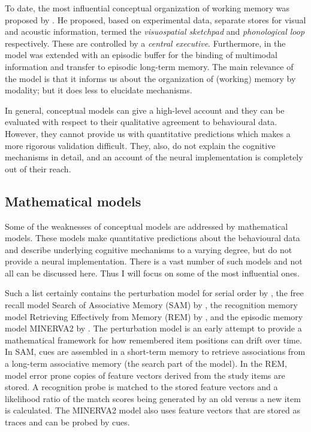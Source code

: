 To date, the most influential conceptual organization of working memory was proposed by \textcite{Baddeley1986}.
He proposed, based on experimental data, separate stores for visual and acoustic information, termed the \emph{visuospatial sketchpad} and \emph{phonological loop} respectively.
These are controlled by a \emph{central executive}.
Furthermore, in \textcite{Baddeley2000} the model was extended with an episodic buffer for the binding of multimodal information and transfer to episodic long-term memory.
The main relevance of the model is that it informs us about the organization of (working) memory by modality; but it does less to elucidate mechanisms.

In general, conceptual models can give a high-level account and they can be evaluated with respect to their qualitative agreement to behavioural data.
However, they cannot provide us with quantitative predictions which makes a more rigorous validation difficult.
They, also, do not explain the cognitive mechanisms in detail, and an account of the neural implementation is completely out of their reach.


\subsection{Mathematical models}
Some of the weaknesses of conceptual models are addressed by mathematical models.
These models make quantitative predictions about the behavioural data and describe underlying cognitive mechanisms to a varying degree, but do not provide a neural implementation.
There is a vast number of such models and not all can be discussed here.
Thus I will focus on some of the most influential ones.

Such a list certainly contains the perturbation model for serial order by \textcite{Estes1972}, the free recall model Search of Associative Memory (SAM) by \textcite{Raaijmakers1981}, the recognition memory model Retrieving Effectively from Memory (REM) by \textcite{Shiffrin1997}, and the episodic memory model MINERVA2 by \textcite{Hintzman1988}.
The perturbation model is an early attempt to provide a mathematical framework for how remembered item positions can drift over time.
In SAM, cues are assembled in a short-term memory to retrieve associations from a long-term associative memory (the search part of the model).
In the REM, model error prone copies of feature vectors derived from the study items are stored.
A recognition probe is matched to the stored feature vectors and a likelihood ratio of the match scores being generated by an old versus a new item is calculated.
The MINERVA2 model also uses feature vectors that are stored as traces and can be probed by cues.

